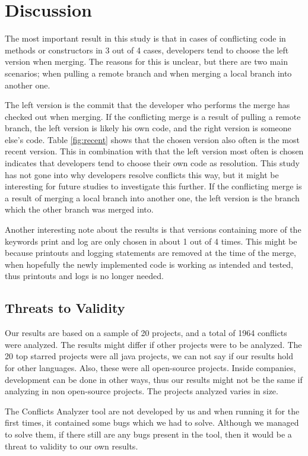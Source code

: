 \section{Discussion}
The most important result in this study is that in cases of conflicting code in methods or constructors in 3 out of 4 cases, developers tend to choose the left version when merging. The reasons for this is unclear, but there are two main scenarios; when pulling a remote branch and when merging a local branch into another one.

The left version is the commit that the developer who performs the merge has checked out when merging. If the conflicting merge is a result of pulling a remote branch, the left version is likely his own code, and the right version is someone else’s code. Table \ref{fig:recent} shows that the chosen version also often is the most recent version. This in combination with that the left version most often is chosen indicates that developers tend to choose their own code as resolution. This study has not gone into why developers resolve conflicts this way, but it might be interesting for future studies to investigate this further. If the conflicting merge is a result of merging a local branch into another one, the left version is the branch which the other branch was merged into.

Another interesting note about the results is that versions containing more of the keywords print and log are only chosen in about 1 out of 4 times. This might be because printouts and logging statements are removed at the time of the merge, when hopefully the newly implemented code is working as intended and tested, thus printouts and logs is no longer needed.

\subsection{Threats to Validity}
Our results are based on a sample of 20 projects, and a total of 1964 conflicts were analyzed. The results might differ if other projects were to be analyzed. The 20 top starred projects were all java projects, we can not say if our results hold for other languages. Also, these were all open-source projects. Inside companies, development can be done in other ways, thus our results might not be the same if analyzing in non open-source projects. The projects analyzed varies in size. 

The Conflicts Analyzer tool are not developed by us and when running it for the first times, it contained some bugs which we had to solve. Although we managed to solve them, if there still are any bugs present in the tool, then it would be a threat to validity to our own results.

